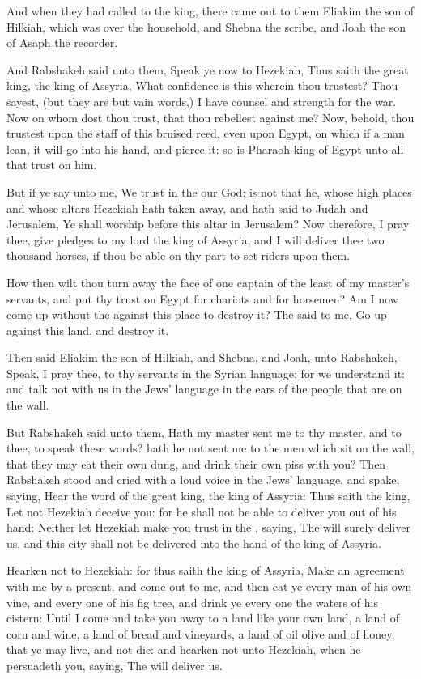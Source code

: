 \verse And when they had called to the king, there came out to them Eliakim the son of Hilkiah, which was over the household, and Shebna the scribe, and Joah the son of Asaph the recorder.

\verse And Rabshakeh said unto them, Speak ye now to Hezekiah, Thus saith the great king, the king of Assyria, What confidence is this wherein thou trustest?  \verse Thou sayest, (but they are but vain words,) I have counsel and strength for the war. Now on whom dost thou trust, that thou rebellest against me?  \verse Now, behold, thou trustest upon the staff of this bruised reed, even upon Egypt, on which if a man lean, it will go into his hand, and pierce it: so is Pharaoh king of Egypt unto all that trust on him.

\verse But if ye say unto me, We trust in the \LORD our God: is not that he, whose high places and whose altars Hezekiah hath taken away, and hath said to Judah and Jerusalem, Ye shall worship before this altar in Jerusalem?  \verse Now therefore, I pray thee, give pledges to my lord the king of Assyria, and I will deliver thee two thousand horses, if thou be able on thy part to set riders upon them.

\verse How then wilt thou turn away the face of one captain of the least of my master's servants, and put thy trust on Egypt for chariots and for horsemen?  \verse Am I now come up without the \LORD against this place to destroy it?  The \LORD said to me, Go up against this land, and destroy it.

\verse Then said Eliakim the son of Hilkiah, and Shebna, and Joah, unto Rabshakeh, Speak, I pray thee, to thy servants in the Syrian language; for we understand it: and talk not with us in the Jews' language in the ears of the people that are on the wall.

\verse But Rabshakeh said unto them, Hath my master sent me to thy master, and to thee, to speak these words? hath he not sent me to the men which sit on the wall, that they may eat their own dung, and drink their own piss with you?  \verse Then Rabshakeh stood and cried with a loud voice in the Jews' language, and spake, saying, Hear the word of the great king, the king of Assyria: \verse Thus saith the king, Let not Hezekiah deceive you: for he shall not be able to deliver you out of his hand: \verse Neither let Hezekiah make you trust in the \LORD, saying, The \LORD will surely deliver us, and this city shall not be delivered into the hand of the king of Assyria.

\verse Hearken not to Hezekiah: for thus saith the king of Assyria, Make an agreement with me by a present, and come out to me, and then eat ye every man of his own vine, and every one of his fig tree, and drink ye every one the waters of his cistern: \verse Until I come and take you away to a land like your own land, a land of corn and wine, a land of bread and vineyards, a land of oil olive and of honey, that ye may live, and not die: and hearken not unto Hezekiah, when he persuadeth you, saying, The \LORD will deliver us.

